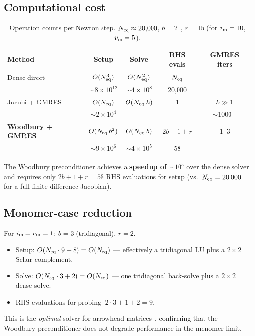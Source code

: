 \documentclass[11pt]{article}
\newcommand{\Neq}{N_{\rm eq}}
\newcommand{\im}{i_{\rm m}}
\newcommand{\vm}{v_{\rm m}}
\newcommand{\bw}{b}
\newcommand{\rank}{r}
\begin{document}
\subsection{Computational cost}

\begin{table}[H]
\centering
\caption{Operation counts per Newton step. $\Neq \approx 20{,}000$,
$\bw = 21$, $\rank = 15$ (for $\im = 10$, $\vm = 5$).}
\label{tab:cost}
\begin{tabular}{@{}lcccc@{}}
\toprule
\textbf{Method} & \textbf{Setup} & \textbf{Solve} &
  \textbf{RHS evals} & \textbf{GMRES iters} \\
\midrule
Dense direct & $O(\Neq^{3})$ & $O(\Neq^{2})$ & $\Neq$ & --- \\
 & $\sim 8 \times 10^{12}$ & $\sim 4 \times 10^{8}$ & 20{,}000 & \\
\addlinespace
Jacobi + GMRES & $O(\Neq)$ & $O(\Neq\,k)$ & 1 & $k \gg 1$ \\
 & $\sim 2 \times 10^{4}$ & --- & & $\sim$1000+ \\
\addlinespace
\textbf{Woodbury + GMRES} & $O(\Neq\,\bw^{2})$ & $O(\Neq\,\bw)$ &
  $2\bw + 1 + \rank$ & 1--3 \\
 & $\sim 9 \times 10^{6}$ & $\sim 4 \times 10^{5}$ & 58 & \\
\bottomrule
\end{tabular}
\end{table}

The Woodbury preconditioner achieves a \textbf{speedup of
$\sim\!10^{5}$} over the dense solver and requires only
$2\bw + 1 + \rank = 58$ RHS evaluations for setup (vs.\ $\Neq =
20{,}000$ for a full finite-difference Jacobian).

\subsection{Monomer-case reduction}

For $\im = \vm = 1$: $\bw = 3$ (tridiagonal), $\rank = 2$.
\begin{itemize}
  \item Setup: $O(\Neq \cdot 9 + 8) = O(\Neq)$
    --- effectively a tridiagonal LU plus a $2 \times 2$ Schur
    complement.
  \item Solve: $O(\Neq \cdot 3 + 2) = O(\Neq)$
    --- one tridiagonal back-solve plus a $2 \times 2$ dense solve.
  \item RHS evaluations for probing: $2 \cdot 3 + 1 + 2 = 9$.
\end{itemize}
This is the \emph{optimal} solver for arrowhead
matrices~\cite{GolubVanLoan2013}, confirming that the Woodbury
preconditioner does not degrade performance in the monomer limit.
\end{document}
